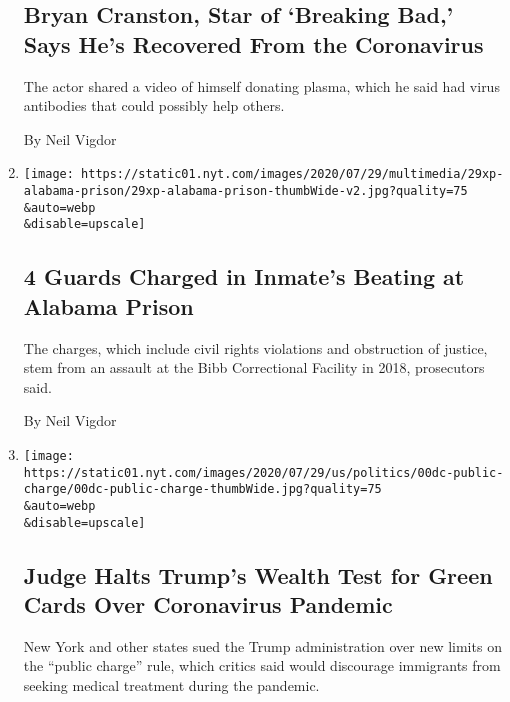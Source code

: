 \begin{enumerate}
{  \subsection{Bryan Cranston, Star of `Breaking Bad,' Says He's
  Recovered From the
  Coronavirus}\label{bryan-cranston-star-of-breaking-bad-says-hes-recovered-from-the-coronavirus}}

  The actor shared a video of himself donating plasma, which he said had
  virus antibodies that could possibly help others.

  By Neil Vigdor
\item
  \href{/2020/07/30/us/alabama-correction-officers-charged.html}{}

  \texttt{[image: https://static01.nyt.com/images/2020/07/29/multimedia/29xp-alabama-prison/29xp-alabama-prison-thumbWide-v2.jpg?quality=75\\\&auto=webp\\\&disable=upscale]}

  \hypertarget{4-guards-charged-in-inmates-beating-at-alabama-prison}{%
  \subsection{4 Guards Charged in Inmate's Beating at Alabama
  Prison}\label{4-guards-charged-in-inmates-beating-at-alabama-prison}}

  The charges, which include civil rights violations and obstruction of
  justice, stem from an assault at the Bibb Correctional Facility in
  2018, prosecutors said.

  By Neil Vigdor
\item
  \href{/2020/07/30/us/trump-green-card.html}{}

  \texttt{[image: https://static01.nyt.com/images/2020/07/29/us/politics/00dc-public-charge/00dc-public-charge-thumbWide.jpg?quality=75\\\&auto=webp\\\&disable=upscale]}

  \hypertarget{judge-halts-trumps-wealth-test-for-green-cards-over-coronavirus-pandemic}{%
  \subsection{Judge Halts Trump's Wealth Test for Green Cards Over
  Coronavirus
  Pandemic}\label{judge-halts-trumps-wealth-test-for-green-cards-over-coronavirus-pandemic}}

  New York and other states sued the Trump administration over new
  limits on the ``public charge'' rule, which critics said would
  discourage immigrants from seeking medical treatment during the
  pandemic.


\end{enumerate}
